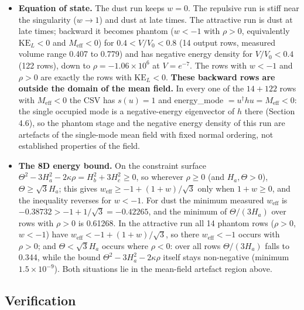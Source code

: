 \documentclass[11pt]{article}
\begin{document}
\begin{itemize}
\item \textbf{Equation of state.} The dust run keeps $w=0$. The repulsive run is stiff near the singularity ($w\to1$) and dust at late times. The attractive run is dust at late times; backward it becomes phantom ($w<-1$ with $\rho>0$, equivalently $\mathrm{KE}_L<0$ and $M_{\mathrm{eff}}<0$) for $0.4<V/V_0<0.8$ (14 output rows, measured volume range 0.407 to 0.779) and has negative energy density for $V/V_0<0.4$ (122 rows), down to $\rho=-1.06\times10^{6}$ at $V=e^{-7}$. The rows with $w<-1$ and $\rho>0$ are exactly the rows with $\mathrm{KE}_L<0$. \textbf{These backward rows are outside the domain of the mean field.} In every one of the $14+122$ rows with $M_{\mathrm{eff}}<0$ the CSV has $s(u)=1$ and energy\_mode $=u^\dagger hu=M_{\mathrm{eff}}<0$: the single occupied mode is a negative-energy eigenvector of $h$ there (Section 4.6), so the phantom stage and the negative energy density of this run are artefacts of the single-mode mean field with fixed normal ordering, not established properties of the field.
\item \textbf{The 8D energy bound.} On the constraint surface $\Theta^2-3H_a^2-2\kappa\rho=H_b^2+3H_c^2\ge0$, so wherever $\rho\ge0$ (and $H_a,\Theta>0$), $\Theta\ge\sqrt3H_a$; this gives $w_{\mathrm{eff}}\ge-1+(1+w)/\sqrt3$ only when $1+w\ge0$, and the inequality reverses for $w<-1$. For dust the minimum measured $w_{\mathrm{eff}}$ is $-0.38732>-1+1/\sqrt3=-0.42265$, and the minimum of $\Theta/(3H_a)$ over rows with $\rho>0$ is 0.61268. In the attractive run all 14 phantom rows ($\rho>0$, $w<-1$) have $w_{\mathrm{eff}}<-1+(1+w)/\sqrt3$, so there $w_{\mathrm{eff}}<-1$ occurs with $\rho>0$; and $\Theta<\sqrt3H_a$ occurs where $\rho<0$: over all rows $\Theta/(3H_a)$ falls to 0.344, while the bound $\Theta^2-3H_a^2-2\kappa\rho$ itself stays non-negative (minimum $1.5\times10^{-9}$). Both situations lie in the mean-field artefact region above.
\end{itemize}

\subsection{Verification}
\end{document}

